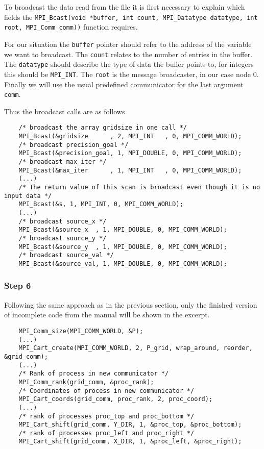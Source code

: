 To broadcast the data read from the file it is first necessary to explain which fields the \texttt{MPI\_Bcast(void *buffer, int count, MPI\_Datatype datatype, int root, MPI\_Comm comm))} function requires. 

For our situation the \texttt{buffer} pointer should refer to the address of the variable we want to broadcast. The \texttt{count} relates to the number of entries in the buffer. The \texttt{datatype} should describe the type of data the buffer points to, \eg for integers this should be \texttt{MPI\_INT}. The \texttt{root} is the message broadcaster, in our case node 0. Finally we will use the usual predefined communicator for the last argument \texttt{comm}.

Thus the broadcast calls are as follows
\begin{lstlisting}
	/* broadcast the array gridsize in one call */
	MPI_Bcast(&gridsize      , 2, MPI_INT   , 0, MPI_COMM_WORLD);
	/* broadcast precision_goal */
	MPI_Bcast(&precision_goal, 1, MPI_DOUBLE, 0, MPI_COMM_WORLD);
	/* broadcast max_iter */  
	MPI_Bcast(&max_iter      , 1, MPI_INT   , 0, MPI_COMM_WORLD);
	(...)
	/* The return value of this scan is broadcast even though it is no input data */
	MPI_Bcast(&s, 1, MPI_INT, 0, MPI_COMM_WORLD);
	(...)
	/* broadcast source_x */
	MPI_Bcast(&source_x  , 1, MPI_DOUBLE, 0, MPI_COMM_WORLD);
	/* broadcast source_y */
	MPI_Bcast(&source_y  , 1, MPI_DOUBLE, 0, MPI_COMM_WORLD);
	/* broadcast source_val */
	MPI_Bcast(&source_val, 1, MPI_DOUBLE, 0, MPI_COMM_WORLD);
\end{lstlisting}

\subsubsection{Step 6}

Following the same approach as in the previous section, only the finished version of incomplete code from the manual will be shown in the excerpt.
\begin{lstlisting}
	MPI_Comm_size(MPI_COMM_WORLD, &P);
	(...)
	MPI_Cart_create(MPI_COMM_WORLD, 2, P_grid, wrap_around, reorder, &grid_comm);
	(...)
	/* Rank of process in new communicator */
	MPI_Comm_rank(grid_comm, &proc_rank);
	/* Coordinates of process in new communicator */
	MPI_Cart_coords(grid_comm, proc_rank, 2, proc_coord);
	(...)
	/* rank of processes proc_top and proc_bottom */
	MPI_Cart_shift(grid_comm, Y_DIR, 1, &proc_top, &proc_bottom);
	/* rank of processes proc_left and proc_right */
	MPI_Cart_shift(grid_comm, X_DIR, 1, &proc_left, &proc_right);
\end{lstlisting}

